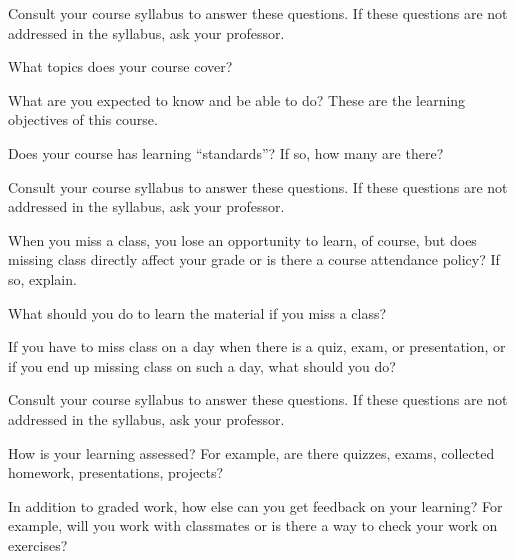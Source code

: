 \begin{exer} [\exerP]%
\label{exer_topics}
    Consult your course syllabus to answer these questions.  If these questions are not addressed in the syllabus, ask your professor.      
    \begin{exerpart}
        \item What topics does your course cover?
        \item What are you expected to know and be able to do?  These are the learning objectives of this course.
        \item Does your course has learning ``standards''? If so, how many are there?
    \end{exerpart}
\end{exer}

\begin{exer}[\exerP]%
\label{exer_att}  
    Consult your course syllabus to answer these questions.  If these questions are not addressed in the syllabus, ask your professor.
    \begin{exerpart}
        \item When you miss a class, you lose an opportunity to learn, of course, but does missing class directly affect your grade or is there a course attendance policy?  If so, explain.
        \item What should you do to learn the material if you miss a class?
        \item If you have to miss class on a day when there is a quiz, exam, or presentation, or if you end up missing class on such a day, what should you do?
    \end{exerpart}
\end{exer}

\begin{exer} [\exerP]%
\label{exer_assessment}
    Consult your course syllabus to answer these questions.  If these questions are not addressed in the syllabus, ask your professor.    
    \begin{exerpart}
        \item How is your learning assessed?  For example, are there quizzes, exams, collected homework, presentations, projects?  
        \item In addition to graded work, how else can you get feedback on your learning?  For example, will you work with classmates or is there a way to check your work on exercises?
    \end{exerpart}
\end{exer}

